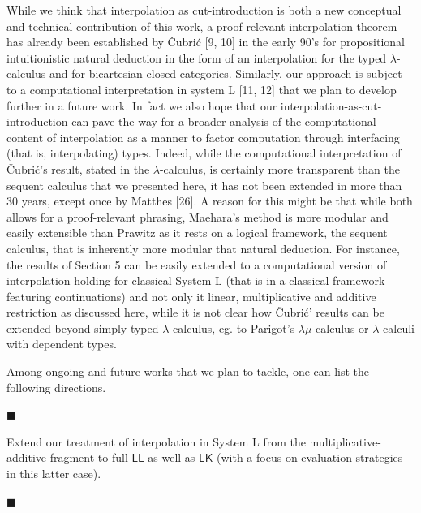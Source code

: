 \documentclass[10pt,a4paper]{article}
\begin{document}
While we think that interpolation as cut-introduction is both a new conceptual and technical contribution of this work, a proof-relevant interpolation theorem has already been established by Čubrić [9, 10] in the early 90’s for propositional intuitionistic natural deduction in the form of an interpolation for the typed $\lambda$-calculus and for bicartesian closed categories. Similarly, our approach is subject to a computational interpretation in system L [11, 12] that we plan to develop further in a future work. In fact we also hope that our interpolation-as-cut-introduction can pave the way for a broader analysis of the computational content of interpolation as a manner to factor computation through interfacing (that is, interpolating) types. Indeed, while the computational interpretation of Čubrić’s result, stated in the $\lambda$-calculus, is certainly more transparent than the sequent calculus that we presented here, it has not been extended in more than 30 years, except once by Matthes [26]. A reason for this might be that while both allows for a proof-relevant phrasing, Maehara’s method is more modular and easily extensible than Prawitz as it rests on a logical framework, the sequent calculus, that is inherently more modular that natural deduction. For instance, the results of Section 5 can be easily extended to a computational version of interpolation holding for classical System L (that is in a classical framework featuring continuations) and not only it linear, multiplicative and additive restriction as discussed here, while it is not clear how Čubrić’ results can be extended beyond simply typed $\lambda$-calculus, eg. to Parigot’s $\lambda\mu$-calculus or $\lambda$-calculi with dependent types.\par
 
 
 
Among ongoing and future works that we plan to tackle, one can list the following directions.\par
  
\par\noindent  $\blacksquare$ 
 
Extend our treatment of interpolation in System L from the multiplicative-additive fragment to full $\mathsf{LL}$ as well as $\mathsf{LK}$ (with a focus on evaluation strategies in this latter case).\par
 
 
 
\par\noindent  $\blacksquare$ 
 
\end{document}
